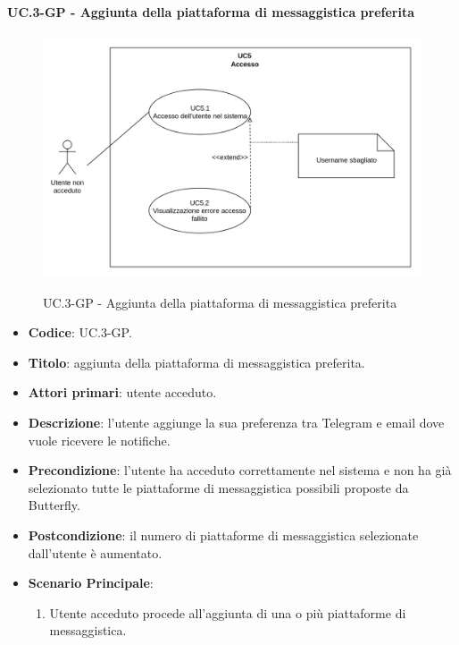 			\paragraph{UC\theuccount.3-GP - Aggiunta della piattaforma di messaggistica preferita}
				\begin{figure}[H]
					\centering
					\includegraphics[width=\columnwidth]{img/UC5.png}\\
					\caption{UC\theuccount.3-GP - Aggiunta della piattaforma di messaggistica preferita}
				\end{figure}
				\begin{itemize}
					\item \textbf{Codice}: UC\theuccount.3-GP.
					\item \textbf{Titolo}: aggiunta della piattaforma di messaggistica preferita.
					\item \textbf{Attori primari}: utente acceduto.
					\item \textbf{Descrizione}: l’utente aggiunge la sua preferenza tra Telegram e email dove
					vuole ricevere le notifiche.
					\item \textbf{Precondizione}: l’utente ha acceduto correttamente nel sistema e non ha
					già selezionato tutte le piattaforme di messaggistica possibili proposte da Butterfly.
					\item \textbf{Postcondizione}: il numero di piattaforme di messaggistica selezionate dall’utente è aumentato.
					\item \textbf{Scenario Principale}:
					\begin{enumerate}
						\item Utente acceduto procede all'aggiunta di una o più piattaforme di messaggistica.
					\end{enumerate}
				\end{itemize}
			
